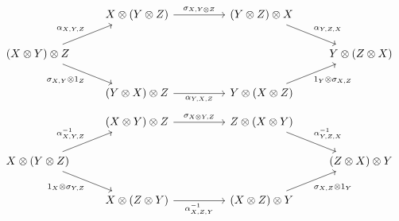 \begin{center}
\begin{equation}\label{diagram:braidedhex1}
\begin{tikzcd}
&
X \otimes (Y \otimes Z) 
\arrow[r, "\sigma_{X, Y\otimes Z}"]
&[0.8cm]
(Y \otimes Z) \otimes X
\arrow[dr, "\alpha_{Y, Z, X}"]
&
\\
(X \otimes Y)\otimes Z
\arrow[ur, "\alpha_{X, Y, Z}"]
\arrow[dr, swap, "\sigma_{X, Y} \otimes 1_Z"]
&
&
&
Y \otimes (Z \otimes X)
\\
&
(Y \otimes X) \otimes Z
\arrow[r, swap, "\alpha_{Y, X, Z}"]
&
Y \otimes (X \otimes Z)
\arrow[ur, swap, "1_Y \otimes \sigma_{X, Z}"]
&
\end{tikzcd}
\end{equation}
\begin{equation}\label{diagram:braidedhex2}
\begin{tikzcd}
&
(X\otimes Y) \otimes Z
\arrow[r, "\sigma_{X\otimes Y, Z}"]
&[0.8cm]
Z \otimes (X\otimes Y)
\arrow[dr, "\alpha^{-1}_{Y, Z, X}"]
&
\\
X\otimes (Y\otimes Z)
\arrow[ur, "\alpha^{-1}_{X, Y, Z}"]
\arrow[dr, swap, "1_X \otimes \sigma_{Y,Z}"]
&
&
&
(Z\otimes X) \otimes Y
\\
&
X\otimes(Z \otimes Y)
\arrow[r, swap, "\alpha^{-1}_{X, Z, Y}"]
&
(X \otimes Z) \otimes Y
\arrow[ur, swap,  "\sigma_{X, Z} \otimes 1_Y"]
&
\end{tikzcd}
\end{equation} 
\end{center}